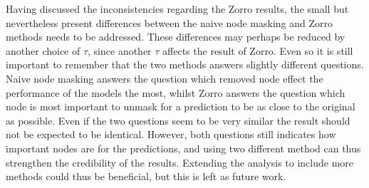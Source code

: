 Having discussed the inconsistencies regarding the Zorro results, the small but nevertheless present differences between the naive node masking and Zorro methods needs to be addressed. These differences may perhaps be reduced by another choice of $\tau$, since another $\tau$ affects the result of Zorro. Even so it is still important to remember that the two methods answers slightly different questions. Naive node masking answers the question which removed node effect the performance of the models the most, whilst Zorro answers the question which node is most important to unmask for a prediction to be as close to the original as possible. Even if the two questions seem to be very similar the result should not be expected to be identical. However, both questions still indicates how important nodes are for the predictions, and using two different method can thus strengthen the credibility of the results. Extending the analysis to include more methods could thus be beneficial, but this is left as future work.

